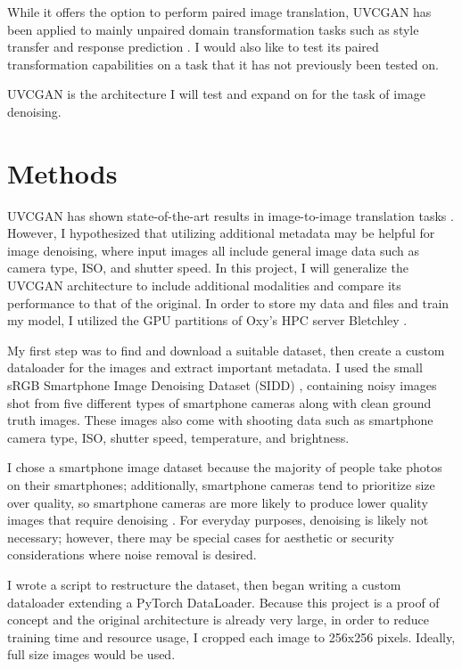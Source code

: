 \documentclass[10pt,twocolumn]{article}
\begin{document}
While it offers the option to perform paired image translation, UVCGAN has been applied to mainly unpaired domain transformation tasks such as style transfer and response prediction \cite{uvcgan4slats}. I would also like to test its paired transformation capabilities on a task that it has not previously been tested on.

UVCGAN is the architecture I will test and expand on for the task of image denoising.

\section{Methods}

UVCGAN has shown state-of-the-art results in image-to-image translation tasks \cite{uvcgan}. However, I hypothesized that utilizing additional metadata may be helpful for image denoising, where input images all include general image data such as camera type, ISO, and shutter speed. In this project, I will generalize the UVCGAN architecture to include additional modalities and compare its performance to that of the original. In order to store my data and files and train my model, I utilized the GPU partitions of Oxy’s HPC server Bletchley \cite{bletchley}.

My first step was to find and download a suitable dataset, then create a custom dataloader for the images and extract important metadata. I used the small sRGB Smartphone Image Denoising Dataset (SIDD) \cite{sidd}, containing noisy images shot from five different types of smartphone cameras along with clean ground truth images. These images also come with shooting data such as smartphone camera type, ISO, shutter speed, temperature, and brightness. 

I chose a smartphone image dataset because the majority of people take photos on their smartphones; additionally, smartphone cameras tend to prioritize size over quality, so smartphone cameras are more likely to produce lower quality images that require denoising \cite{cam}. For everyday purposes, denoising is likely not necessary; however, there may be special cases for aesthetic or security considerations where noise removal is desired. 

I wrote a script to restructure the dataset, then began writing a custom dataloader extending a PyTorch DataLoader. Because this project is a proof of concept and the original architecture is already very large, in order to reduce training time and resource usage, I cropped each image to 256x256 pixels. Ideally, full size images would be used.
\end{document}
